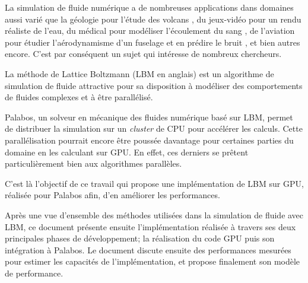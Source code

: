La simulation de fluide numérique a de nombreuses applications dans domaines aussi varié que la géologie pour l'étude des volcans \cite{brogi_lattice_2017}, du jeux-vidéo pour un rendu réaliste de l'eau, du médical pour modéliser l'écoulement du sang \cite{hirabayashi_lattice_2004}, de l'aviation pour étudier l'aérodynamisme d'un fuselage et en prédire le bruit \cite{brogi_lattice_2017}, et bien autres encore. C'est par conséquent un sujet qui intéresse de nombreux chercheurs.

La méthode de Lattice Boltzmann (\acf{LBM} en anglais) est un algorithme de simulation de fluide attractive pour sa disposition à modéliser des comportements de fluides complexes et à être parallélisé.

Palabos, un solveur en mécanique des fluides numérique basé sur \acs{LBM}, permet de distribuer la simulation sur un \textit{cluster} de \acs{CPU} pour accélérer les calculs. Cette parallélisation pourrait encore être poussée  davantage pour certaines parties du domaine en les calculant sur \acs{GPU}. En effet, ces derniers se prêtent particulièrement bien aux algorithmes parallèles.

C'est là l'objectif de ce travail qui propose une implémentation de \acs{LBM} sur \acs{GPU}, réalisée pour Palabos afin, d'en améliorer les performances.

Après une vue d'ensemble des méthodes utilisées dans la simulation de fluide avec \acs{LBM}, ce document présente ensuite l'implémentation réalisée à travers ses deux principales phases de développement; la réalisation du code \acs{GPU} puis son intégration à Palabos.
Le document discute ensuite des performances mesurées pour estimer les capacités de l'implémentation, et propose finalement son modèle de performance.

